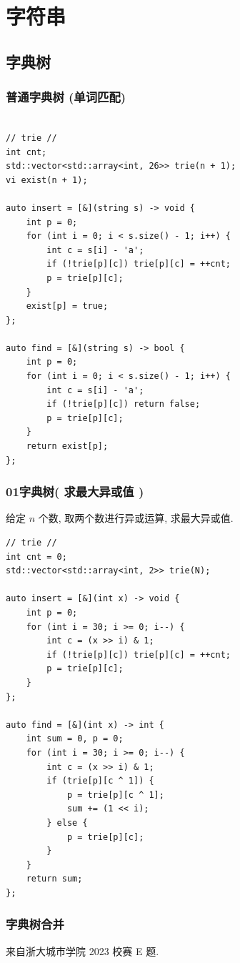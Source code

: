 \documentclass[UTF8, a4paper, titlepage, twoside]{ctexart}
\begin{document}
\newpage
\section{ 字符串 }

\subsection{ 字典树 }
\subsubsection{ 普通字典树 (单词匹配) }
\begin{lstlisting}

// trie //
int cnt;
std::vector<std::array<int, 26>> trie(n + 1);
vi exist(n + 1);

auto insert = [&](string s) -> void {
    int p = 0;
    for (int i = 0; i < s.size() - 1; i++) {
        int c = s[i] - 'a';
        if (!trie[p][c]) trie[p][c] = ++cnt;
        p = trie[p][c];
    }
    exist[p] = true;
};

auto find = [&](string s) -> bool {
    int p = 0;
    for (int i = 0; i < s.size() - 1; i++) {
        int c = s[i] - 'a';
        if (!trie[p][c]) return false;
        p = trie[p][c];
    }
    return exist[p];
};
\end{lstlisting}

\subsubsection{ 01字典树( 求最大异或值 ) }
给定 $n$ 个数, 取两个数进行异或运算, 求最大异或值. 
\begin{lstlisting}
// trie //
int cnt = 0;
std::vector<std::array<int, 2>> trie(N);

auto insert = [&](int x) -> void {
    int p = 0;
    for (int i = 30; i >= 0; i--) {
        int c = (x >> i) & 1;
        if (!trie[p][c]) trie[p][c] = ++cnt;
        p = trie[p][c];
    }
};

auto find = [&](int x) -> int {
    int sum = 0, p = 0;
    for (int i = 30; i >= 0; i--) {
        int c = (x >> i) & 1;
        if (trie[p][c ^ 1]) {
            p = trie[p][c ^ 1];
            sum += (1 << i);
        } else {
            p = trie[p][c];
        }
    }
    return sum;
};
\end{lstlisting}

\subsubsection{ 字典树合并 }
来自浙大城市学院 2023 校赛 E 题. 
\end{document}

